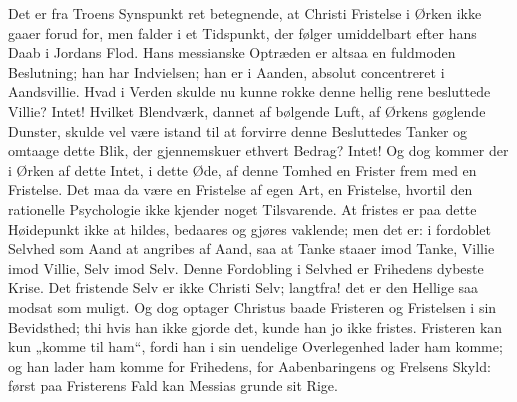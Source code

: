 \documentclass[12pt]{book}
\begin{document}
Det er fra Troens Synspunkt ret betegnende, at Christi Fristelse i
Ørken ikke gaaer forud for, men falder i et Tidspunkt, der følger
umiddelbart efter hans Daab i Jordans Flod. Hans messianske
Optræden er altsaa en fuldmoden Beslutning; han har Indvielsen; han
er i Aanden, absolut concentreret i Aandsvillie. Hvad i Verden
skulde nu kunne rokke denne hellig rene besluttede Villie? Intet!
Hvilket Blendværk, dannet af bølgende Luft, af Ørkens gøglende
Dunster, skulde vel være istand til at forvirre denne Besluttedes
Tanker og omtaage dette Blik, der gjennemskuer ethvert Bedrag?
Intet! Og dog kommer der i Ørken af dette Intet, i dette Øde, af
denne Tomhed en Frister frem med en Fristelse. Det maa da være en
Fristelse af egen Art, en Fristelse, hvortil den rationelle
Psychologie ikke kjender noget Tilsvarende. At fristes er paa dette
Høidepunkt ikke at hildes, bedaares
og gjøres vaklende; men det er: i fordoblet Selvhed som Aand at
angribes af Aand, saa at Tanke staaer imod Tanke, Villie imod
Villie, Selv imod Selv. Denne Fordobling i Selvhed er Frihedens
dybeste Krise. Det fristende Selv er ikke Christi Selv; langtfra!
det er den Hellige saa modsat som muligt. Og dog optager Christus
baade Fristeren og Fristelsen i sin Bevidsthed; thi hvis han ikke
gjorde det, kunde han jo ikke fristes. Fristeren kan kun „komme til
ham“, fordi han i sin uendelige Overlegenhed lader ham komme; og han
lader ham komme for Frihedens, for Aabenbaringens og Frelsens Skyld:
først paa Fristerens Fald kan Messias grunde sit Rige.
\end{document}
